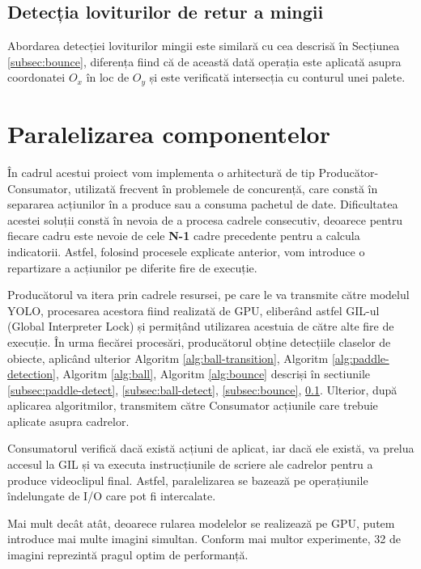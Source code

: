 \subsection{Detecția loviturilor de retur a mingii}
\label{subsec:retur}
Abordarea detecției loviturilor mingii este similară cu cea descrisă în Secțiunea \ref{subsec:bounce}, diferența fiind că de această dată operația este aplicată asupra coordonatei \( O_x \) în loc de \( O_y \) și este verificată intersecția cu conturul unei palete.


\section{Paralelizarea componentelor}

În cadrul acestui proiect vom implementa o arhitectură de tip Producător-Consumator, utilizată frecvent în problemele de concurență, care constă în separarea acțiunilor în a produce sau a consuma pachetul de date. Dificultatea acestei soluții constă în nevoia de a procesa cadrele consecutiv, deoarece pentru fiecare cadru este nevoie de cele \textbf{N-1} cadre precedente pentru a calcula indicatorii. Astfel, folosind procesele explicate anterior, vom introduce o repartizare a acțiunilor pe diferite fire de execuție.

Producătorul va itera prin cadrele resursei, pe care le va transmite către modelul YOLO, procesarea acestora fiind realizată de GPU, eliberând astfel GIL-ul (Global Interpreter Lock) și permițând utilizarea acestuia de către alte fire de execuție. În urma fiecărei procesări, producătorul obține detecțiile claselor de obiecte, aplicând ulterior Algoritm \ref{alg:ball-transition}, Algoritm \ref{alg:paddle-detection}, Algoritm \ref{alg:ball}, Algoritm \ref{alg:bounce} descriși în sectiunile \ref{subsec:paddle-detect}, \ref{subsec:ball-detect}, \ref{subsec:bounce}, \ref{subsec:retur}. Ulterior, după aplicarea algoritmilor, transmitem către Consumator acțiunile care trebuie aplicate asupra cadrelor.
 
Consumatorul verifică dacă există acțiuni de aplicat, iar dacă ele există, va prelua accesul la GIL și va executa instrucțiunile de scriere ale cadrelor pentru a produce videoclipul final. Astfel, paralelizarea se bazează pe operațiunile îndelungate de I/O care pot fi intercalate.

Mai mult decât atât, deoarece rularea modelelor se realizează pe GPU, putem introduce mai multe imagini simultan. Conform mai multor experimente, 32 de imagini reprezintă pragul optim de performanță.

